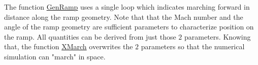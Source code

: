 The function \url{GenRamp} uses a single loop which indicates marching forward in distance along the ramp geometry. Note that that the Mach number and the angle of the ramp geometry are sufficient parameters to characterize position on the ramp. All quantities can be derived from just those $2$ parameters. Knowing that, the function \url{XMarch} overwrites the $2$ parameters so that the numerical simulation can "march" in space.
